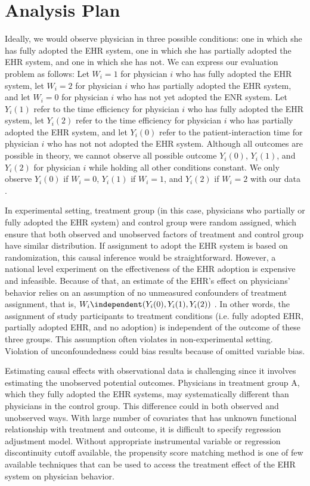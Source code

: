 \section{Analysis Plan}
Ideally, we would observe physician in three possible conditions: one in which she has fully adopted the EHR system, one in which she has partially adopted the EHR system, and one in which she has not. We can express our evaluation problem as follows: Let $W_i = 1$ for physician $i$ who has fully adopted the EHR system, let $W_i = 2$ for physician $i$ who has partially adopted the EHR system, and let $W_i = 0$ for physician $i$ who has not yet adopted the ENR system. Let $Y_i(1)$ refer to the time efficiency for physician $i$ who has fully adopted the EHR system, let $Y_i(2)$ refer to the time efficiency for physician $i$ who has partially adopted the EHR system, and let $Y_i(0)$ refer to the patient-interaction time for physician $i$ who has not not adopted the EHR system. Although all outcomes are possible in theory, we cannot observe all possible outcome $Y_i(0)$, $Y_i(1)$, and $Y_i(2)$ for physician $i$ while holding all other conditions constant. We only observe $Y_i(0)$ if $W_i = 0$, $Y_i(1)$ if $W_i = 1$, and $Y_i(2)$ if $W_i = 2$ with our data \citep{imbens2008recent}.

In experimental setting, treatment group (in this case, physicians who partially or fully adopted the EHR system) and control group were random assigned, which ensure that both observed and unobserved factors of treatment and control group have similar distribution. If assignment to adopt the EHR system is based on randomization, this causal inference would be straightforward. However, a national level experiment on the effectiveness of the EHR adoption is expensive and infeasible. Because of that, an estimate of the EHR's effect on physicians' behavior relies on an assumption of no unmeasured confounders of treatment assignment, that is, $W_i \independent (Y_i(0),Y_i(1),Y_i(2))$ \citep{imbens2008recent}. In other words, the assignment of study participants to treatment conditions (i.e. fully adopted EHR, partially adopted EHR, and no adoption) is independent of the outcome of these three groups. This assumption often violates in non-experimental setting. Violation of unconfoundedness could bias results because of omitted variable bias.

Estimating causal effects with observational data is challenging since it involves estimating the unobserved potential outcomes. Physicians in treatment group A, which they fully adopted the EHR systems, may systematically different than physicians in the control group. This difference could in both observed and unobserved ways. With large number of covariates that has unknown functional relationship with treatment and outcome, it is difficult to specify regression adjustment model. Without appropriate instrumental variable or regression discontinuity cutoff available, the propensity score matching method is one of few available techniques that can be used to access the treatment effect of the EHR system on physician behavior.


